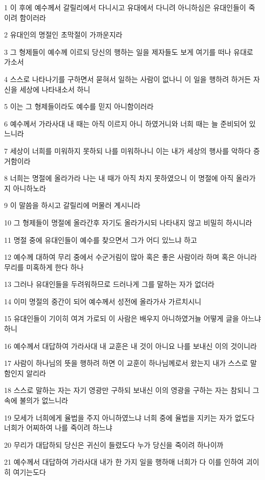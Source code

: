 \par 1 이 후에 예수께서 갈릴리에서 다니시고 유대에서 다니려 아니하심은 유대인들이 죽이려 함이러라
\par 2 유대인의 명절인 초막절이 가까운지라
\par 3 그 형제들이 예수께 이르되 당신의 행하는 일을 제자들도 보게 여기를 떠나 유대로 가소서
\par 4 스스로 나타나기를 구하면서 묻혀서 일하는 사람이 없나니 이 일을 행하려 하거든 자신을 세상에 나타내소서 하니
\par 5 이는 그 형제들이라도 예수를 믿지 아니함이러라
\par 6 예수께서 가라사대 내 때는 아직 이르지 아니 하였거니와 너희 때는 늘 준비되어 있느니라
\par 7 세상이 너희를 미워하지 못하되 나를 미워하나니 이는 내가 세상의 행사를 악하다 증거함이라
\par 8 너희는 명절에 올라가라 나는 내 때가 아직 차지 못하였으니 이 명절에 아직 올라가지 아니하노라
\par 9 이 말씀을 하시고 갈릴리에 머물러 계시니라
\par 10 그 형제들이 명절에 올라간후 자기도 올라가시되 나타내지 않고 비밀히 하시니라
\par 11 명절 중에 유대인들이 예수를 찾으면서 그가 어디 있느냐 하고
\par 12 예수께 대하여 무리 중에서 수군거림이 많아 혹은 좋은 사람이라 하며 혹은 아니라 무리를 미혹하게 한다 하나
\par 13 그러나 유대인들을 두려워하므로 드러나게 그를 말하는 자가 없더라
\par 14 이미 명절의 중간이 되어 예수께서 성전에 올라가사 가르치시니
\par 15 유대인들이 기이히 여겨 가로되 이 사람은 배우지 아니하였거늘 어떻게 글을 아느냐 하니
\par 16 예수께서 대답하여 가라사대 내 교훈은 내 것이 아니요 나를 보내신 이의 것이니라
\par 17 사람이 하나님의 뜻을 행하려 하면 이 교훈이 하나님께로서 왔는지 내가 스스로 말함인지 알리라
\par 18 스스로 말하는 자는 자기 영광만 구하되 보내신 이의 영광을 구하는 자는 참되니 그 속에 불의가 없느니라
\par 19 모세가 너희에게 율법을 주지 아니하였느냐 너희 중에 율법을 지키는 자가 없도다 너희가 어찌하여 나를 죽이려 하느냐
\par 20 무리가 대답하되 당신은 귀신이 들렸도다 누가 당신을 죽이려 하나이까
\par 21 예수께서 대답하여 가라사대 내가 한 가지 일을 행하매 너희가 다 이를 인하여 괴이히 여기는도다
